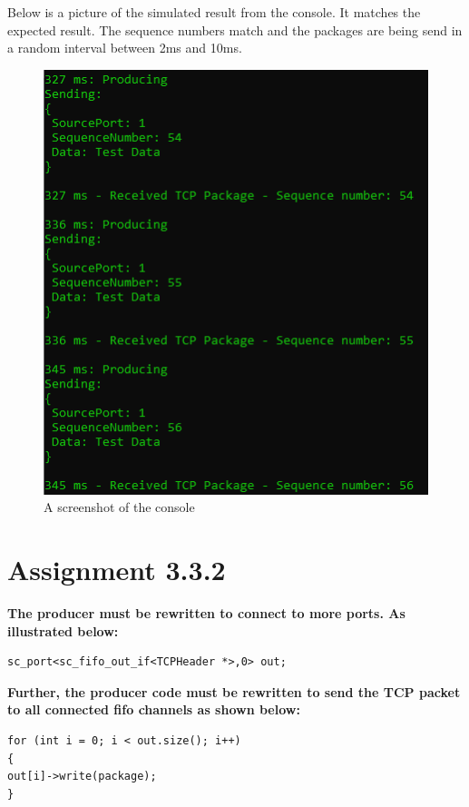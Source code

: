 Below is a picture of the simulated result from the console. 
It matches the expected result. The sequence numbers match and the packages are being send in a random interval between 2ms and 10ms. 


\begin{figure}[H]
	\centering
	\includegraphics[width=\textwidth]{Images/ConsoleWindow3_3.png}
	\caption{A screenshot of the console}
	\label{fig:ConsoleWindow_3_3}
\end{figure}


\section{Assignment 3.3.2}

\textbf{The producer must be rewritten to connect to more ports. As illustrated below:}
	
\begin{lstlisting}
sc_port<sc_fifo_out_if<TCPHeader *>,0> out;
\end{lstlisting}
	
\textbf{Further, the producer code must be rewritten to send the TCP packet to all connected fifo channels as
shown below:}

\begin{lstlisting}	
for (int i = 0; i < out.size(); i++)
{
out[i]->write(package);
}
\end{lstlisting}

